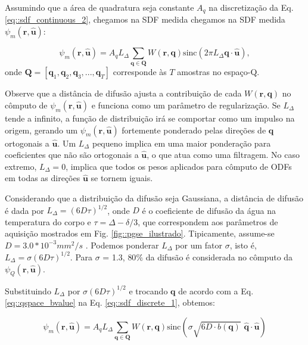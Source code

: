 \documentclass[
    12pt,                %
    oneside,            %
    a4paper,            %
    english,            %
    french,                %
    spanish,            %
    brazil                %
    ]{abntex2}
\begin{document}
Assumindo que a área de quadratura seja constante $A_q$ na discretização da Eq. \ref{eq::sdf_continuous_2}, chegamos na SDF medida  chegamos na SDF medida $\psi_m(\mathbf{r}, \mathbf{\hat{u}})$: 


\begin{equation}
\label{eq::sdf_discrete_1}
    \psi_m(\mathbf{r}, \mathbf{\hat{u}}) =
     A_qL_{\Delta}\sum_{\mathbf{q} \in \mathbf{Q}} W(\mathbf{r}, \mathbf{q})\text{sinc}(2\pi L_{\Delta} \mathbf{q}\cdot\mathbf{\hat{u}}),
\end{equation}
onde $\mathbf{Q}= [
\mathbf{q}_1,
\mathbf{q}_2,
\mathbf{q}_3, ...,
\mathbf{q}_T
]$ corresponde às $T$ amostras no espaço-Q.

Observe que a distância de difusão ajusta a contribuição de cada $W(\mathbf{r}, \mathbf{q})$ no cômputo de $\psi_m(\mathbf{r}, \mathbf{\hat{u}})$ e funciona como um parâmetro de regularização. Se $L_{\Delta}$ tende a infinito, a função de distribuição irá se comportar como um impulso na origem, gerando um $\psi_m(\mathbf{r}, \mathbf{\hat{u}})$ fortemente ponderado pelas direções de $\mathbf{q}$ ortogonais a $\mathbf{\hat{u}}$. Um $L_{\Delta}$ pequeno implica em uma maior ponderação para coeficientes que não são ortogonais a $\mathbf{\hat{u}}$, o que atua como uma filtragem. No caso extremo, $L_{\Delta} = 0$, implica que todos os pesos aplicados para cômputo de ODFs em todas as direções $\mathbf{\hat{u}}$ se tornem iguais.

Considerando que a distribuição da difusão seja Gaussiana, a distância de difusão é dada por $L_{\Delta}=(6D\tau)^{1/2}$, onde $D$ é o coeficiente de difusão da água na temperatura do corpo e $\tau = \Delta - \delta/3$, que correspondem aos parâmetros de aquisição mostrados em Fig. \ref{fig::pgse_ilustrado}. 
Tipicamente, assume-se $D = 3.0*10^{-3} mm^2/s$ \cite{yeh2019_DSI}. Podemos ponderar $L_{\Delta}$ por um fator $\sigma$, isto é, $L_{\Delta} = \sigma(6D\tau)^{1/2}$. Para $\sigma$ = 1.3, $80\%$ da difusão é considerada no cômputo da $\psi_Q(\mathbf{r}, \mathbf{\hat{u}})$.

Substituindo $L_{\Delta}$ por $\sigma(6D\tau)^{1/2}$ e trocando $\mathbf{q}$ de acordo com a Eq. \ref{eq::qspace_bvalue} na Eq. \ref{eq::sdf_discrete_1}, obtemos:



\begin{equation}
\label{eq::sdf_discrete_2}
    \psi_m(\mathbf{r}, \mathbf{\hat{u}}) =
    A_qL_{\Delta}\sum_{\mathbf{q} \in \mathbf{Q}}W(\mathbf{r}, \mathbf{q})\text{sinc}(\sigma \sqrt{6D\cdot b(\mathbf{q})}\,\,  \mathbf{\hat{q}}\cdot\mathbf{\hat{u}})
\end{equation}
\end{document}
